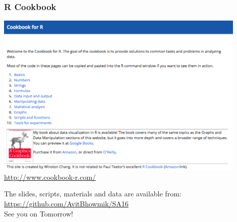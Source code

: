 \documentclass{beamer}
\begin{document}

\begin{frame}
\frametitle{R Cookbook}
\centering
\includegraphics[width=0.9\textwidth]{Figures/cookbook.png}\\
\href{http://www.cookbook-r.com/}{http://www.cookbook-r.com/}
\end{frame}


\begin{frame}
\centering
The slides, scripts, materials and data are available from:\\
\href{https://github.com/AvitBhowmik/SA16}{\alert{https://github.com/AvitBhowmik/SA16}}\\
\vspace{1cm}
\Huge See you on Tomorrow!
\end{frame}

\end{document}
